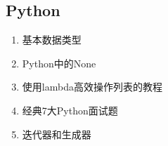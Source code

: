 \documentclass[letterpaper,10pt,english]{sphinxmanual}
\begin{document}
\subsection{Python}
\label{\detokenize{else/01_interview:python}}\begin{enumerate}
\item {} 
基本数据类型

\end{enumerate}
\begin{quote}

\end{quote}
\begin{enumerate}
\setcounter{enumi}{1}
\item {} 
Python中的None

\end{enumerate}
\begin{quote}

\end{quote}
\begin{enumerate}
\setcounter{enumi}{2}
\item {} 
使用lambda高效操作列表的教程

\end{enumerate}
\begin{quote}

\end{quote}
\begin{enumerate}
\setcounter{enumi}{3}
\item {} 
经典7大Python面试题

\end{enumerate}
\begin{quote}

\end{quote}
\begin{enumerate}
\setcounter{enumi}{4}
\item {} 
迭代器和生成器

\end{enumerate}
\begin{quote}

\end{quote}
\end{document}

